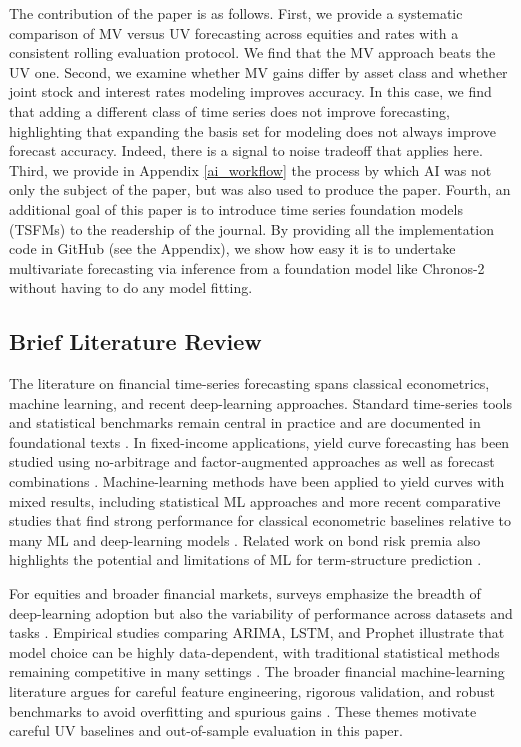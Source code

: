 \documentclass[twocolumn]{article}
\begin{document}
The contribution of the paper is as follows. First, we provide a systematic comparison of MV versus UV forecasting across equities and rates with a consistent rolling evaluation protocol. We find that the MV approach beats the UV one. Second, we examine whether MV gains differ by asset class and whether joint stock and interest rates modeling improves accuracy. In this case, we find that adding a different class of time series does not improve forecasting, highlighting that expanding the basis set for modeling does not always improve forecast accuracy. Indeed, there is a signal to noise tradeoff that applies here. Third, we provide in Appendix \ref{ai_workflow} the process by which AI was not only the subject of the paper, but was also used to produce the paper. Fourth, an additional goal of this paper is to introduce time series foundation models (TSFMs) to the readership of the journal. By providing all the implementation code in GitHub (see the Appendix), we show how easy it is to undertake multivariate forecasting via inference from a foundation model like Chronos-2 without having to do any model fitting. 

\subsection{Brief Literature Review}

The literature on financial time-series forecasting spans classical econometrics, machine learning, and recent deep-learning approaches. Standard time-series tools and statistical benchmarks remain central in practice and are documented in foundational texts \citep{shumway_time_2025}. In fixed-income applications, yield curve forecasting has been studied using no-arbitrage and factor-augmented approaches \citep{moench_forecasting_2006} as well as forecast combinations \citep{caldeira_predicting_2013}. Machine-learning methods have been applied to yield curves with mixed results, including statistical ML approaches \citep{sambasivan_statistical_2017} and more recent comparative studies that find strong performance for classical econometric baselines relative to many ML and deep-learning models \citep{singh_yield_2025}. Related work on bond risk premia also highlights the potential and limitations of ML for term-structure prediction \citep{bianchi_bond_2020,hoogteijling_forecasting_2021}.

For equities and broader financial markets, surveys emphasize the breadth of deep-learning adoption but also the variability of performance across datasets and tasks \citep{sezer_financial_2019}. Empirical studies comparing ARIMA, LSTM, and Prophet illustrate that model choice can be highly data-dependent, with traditional statistical methods remaining competitive in many settings \citep{sunki_time_2024}. The broader financial machine-learning literature argues for careful feature engineering, rigorous validation, and robust benchmarks to avoid overfitting and spurious gains \citep{lopez_de_prado_advances_2018}. These themes motivate careful UV baselines and out-of-sample evaluation in this paper.
\end{document}
